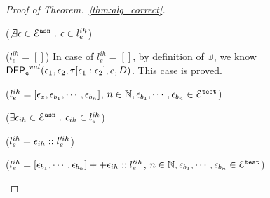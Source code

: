 \begin{proof}[Proof of Theorem.~\ref{thm:alg_correct}]
\begin{case}
\begin{subproof}
  ($\not\exists \mathtt{\epsilon} \in \mathcal{E}^{\mathtt{{asn}}} ~.~ \mathtt{\epsilon} \in l^{ih}_e $)
  \begin{subsubcase}($l^{ih}_e = []$)
    In case of $l^{ih}_e = []$, by definition of $\uplus$, we know $\mathsf{DEP_{\mathtt{e}}}^{val}(\mathtt{\epsilon}_1, \mathtt{\epsilon}_{2}, \mathtt{\tau}[\mathtt{\epsilon}_1:\mathtt{\epsilon}_{2}], c, D)$.
    This case is proved.
      \end{subsubcase}
  \begin{subsubcase}($l^{ih}_e =[\mathtt{\epsilon}_z, \mathtt{\epsilon}_{b_1}, \cdots, \mathtt{\epsilon}_{b_n}]$, $ n \in \mathbb{N}, \mathtt{\epsilon}_{b_1}, \cdots, \mathtt{\epsilon}_{b_n} \in \mathcal{E}^{\mathtt{{test}}}$)
  \end{subsubcase}
  ($\exists \mathtt{\epsilon}_{ih} \in \mathcal{E}^{\mathtt{{asn}}} ~.~ \mathtt{\epsilon}_{ih} \in l^{ih}_e $)
  \begin{subsubcase}($l^{ih}_e = \mathtt{\epsilon}_{ih}::l'^{ih}_e$)
  \end{subsubcase}
  \begin{subsubcase}($l^{ih}_e =[\mathtt{\epsilon}_{b_1}, \cdots, \mathtt{\epsilon}_{b_n}]++ \mathtt{\epsilon}_{ih}::l'^{ih}_e$, $ n \in \mathbb{N}, \mathtt{\epsilon}_{b_1}, \cdots, \mathtt{\epsilon}_{b_n} \in \mathcal{E}^{\mathtt{{test}}}$)
  \end{subsubcase}


\end{subproof}
\end{case}
\end{proof}
